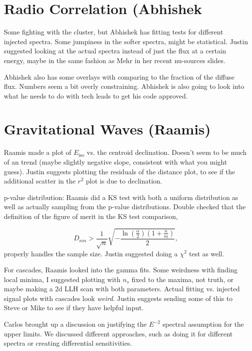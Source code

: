 \section{Radio Correlation (Abhishek}
Some fighting with the cluster, but Abhishek has fitting tests for different injected spectra. Some jumpiness in the softer spectra, might be statistical. Justin suggested looking at the actual spectra instead of just the flux at a certain energy, maybe in the same fashion as Mehr in her recent nu-sources slides.

Abhishek also has some overlays with comparing to the fraction of the diffuse flux. Numbers seem a bit overly constraining. Abhishek is also going to look into what he needs to do with tech leads to get his code approved.

\section{Gravitational Waves (Raamis)}
Raamis made a plot of $E_{\mathrm{iso}}$ vs. the centroid declination. Doesn't seem to be much of an trend (maybe slightly negative slope, consistent with what you might guess). Justin suggests plotting the residuals of the distance plot, to see if the additional scatter in the $r^2$ plot is due to declination.

p-value distribution: Raamis did a KS test with both a uniform distribution as well as actually sampling from the p-value distributions. Double checked that the definition of the figure of merit in the KS test comparison, 

\begin{equation*}
    D_{n m}>\frac{1}{\sqrt{n}} \sqrt{-\frac{\ln \left(\frac{\alpha}{2}\right)\left(1+\frac{n}{m}\right)}{2}},
\end{equation*}
properly handles the sample size. Justin suggested doing a $\chi^2$ test as well.

For cascades, Raamis looked into the gamma fits. Some weirdness with finding local minima, I suggested plotting with $n_s$ fixed to the maxima, not truth, or maybe making a 2d LLH scan with both parameters. Actual fitting vs. injected signal plots with cascades look \textit{weird}. Justin suggests sending some of this to Steve or Mike to see if they have helpful input.

Carlos brought up a discussion on justifying the $E^{-2}$ spectral assumption for the upper limits. We discussed different approaches, such as doing it for different spectra or creating differential sensitivities. 

